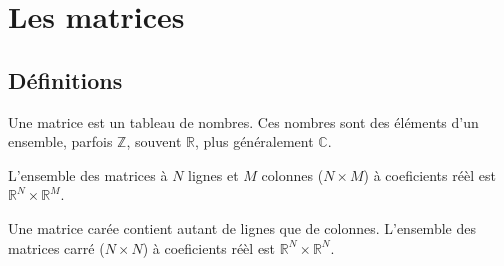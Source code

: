 
\section{Les matrices}
\subsection{Définitions}
Une matrice est un tableau de nombres. Ces nombres sont des éléments d'un ensemble, parfois $\mathbb{Z}$, souvent $\mathbb{R}$, plus généralement $\mathbb{C}$.

L'ensemble des matrices à  $N$ lignes et $M$ colonnes ($N \times M$) à coeficients réèl est
$\mathbb{R}^N \times \mathbb{R}^M$.

Une matrice carée contient autant de lignes que de colonnes.
L'ensemble des matrices carré ($N \times N$) à coeficients réèl est
$\mathbb{R}^N \times \mathbb{R}^N$.






